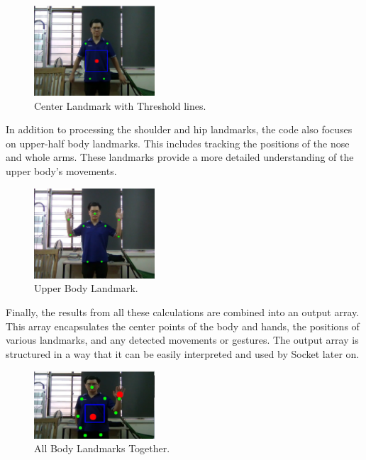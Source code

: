 \documentclass[12pt]{article}
\begin{document}
\begin{figure}[ht]
    \centering
    \includegraphics[width=0.4\textwidth]{pose3.png}
    \caption{Center Landmark with Threshold lines.}
\end{figure}

In addition to processing the shoulder and hip landmarks, the code also focuses on upper-half body landmarks. This includes tracking the positions of the nose and whole arms. These landmarks provide a more detailed understanding of the upper body’s movements.\\

\begin{figure}[ht]
    \centering
    \includegraphics[width=0.4\textwidth]{pose4.png}
    \caption{Upper Body Landmark.}
\end{figure}

Finally, the results from all these calculations are combined into an output array. This array encapsulates the center points of the body and hands, the positions of various landmarks, and any detected movements or gestures. The output array is structured in a way that it can be easily interpreted and used by Socket later on.\\
\begin{figure}[ht]
    \centering
    \includegraphics[width=0.4\textwidth]{all.png}
    \caption{All Body Landmarks Together.}
\end{figure}
\end{document}
